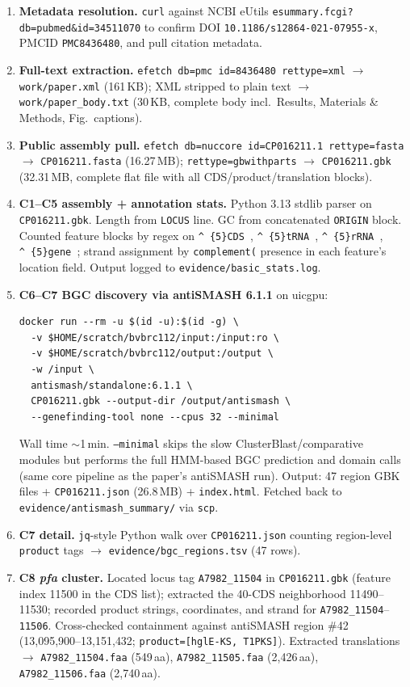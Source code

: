 \documentclass[11pt,letterpaper]{article}
\begin{document}
\begin{enumerate}
\item \textbf{Metadata resolution.} \texttt{curl} against NCBI eUtils \texttt{esummary.fcgi?db=pubmed\&id=34511070} to confirm DOI \texttt{10.1186/s12864-021-07955-x}, PMCID \texttt{PMC8436480}, and pull citation metadata.
\item \textbf{Full-text extraction.} \texttt{efetch db=pmc id=8436480 rettype=xml} $\to$ \texttt{work/paper.xml} (161\,KB); XML stripped to plain text $\to$ \texttt{work/paper\_body.txt} (30\,KB, complete body incl.\ Results, Materials \& Methods, Fig.\ captions).
\item \textbf{Public assembly pull.} \texttt{efetch db=nuccore id=CP016211.1 rettype=fasta} $\to$ \texttt{CP016211.fasta} (16.27\,MB); \texttt{rettype=gbwithparts} $\to$ \texttt{CP016211.gbk} (32.31\,MB, complete flat file with all CDS/product/translation blocks).
\item \textbf{C1--C5 assembly + annotation stats.} Python 3.13 stdlib parser on \texttt{CP016211.gbk}. Length from \texttt{LOCUS} line. GC from concatenated \texttt{ORIGIN} block. Counted feature blocks by regex on \texttt{\textasciicircum{}\ \{5\}CDS\ }, \texttt{\textasciicircum{}\ \{5\}tRNA\ }, \texttt{\textasciicircum{}\ \{5\}rRNA\ }, \texttt{\textasciicircum{}\ \{5\}gene\ }; strand assignment by \texttt{complement(} presence in each feature's location field. Output logged to \texttt{evidence/basic\_stats.log}.
\item \textbf{C6--C7 BGC discovery via antiSMASH 6.1.1} on uicgpu:
\begin{Verbatim}[fontsize=\small]
docker run --rm -u $(id -u):$(id -g) \
  -v $HOME/scratch/bvbrc112/input:/input:ro \
  -v $HOME/scratch/bvbrc112/output:/output \
  -w /input \
  antismash/standalone:6.1.1 \
  CP016211.gbk --output-dir /output/antismash \
  --genefinding-tool none --cpus 32 --minimal
\end{Verbatim}
Wall time $\sim$1\,min. \texttt{--minimal} skips the slow ClusterBlast/comparative modules but performs the full HMM-based BGC prediction and domain calls (same core pipeline as the paper's antiSMASH run). Output: 47 region GBK files + \texttt{CP016211.json} (26.8\,MB) + \texttt{index.html}. Fetched back to \texttt{evidence/antismash\_summary/} via \texttt{scp}.
\item \textbf{C7 detail.} \texttt{jq}-style Python walk over \texttt{CP016211.json} counting region-level \texttt{product} tags $\to$ \texttt{evidence/bgc\_regions.tsv} (47 rows).
\item \textbf{C8 \emph{pfa} cluster.} Located locus tag \texttt{A7982\_11504} in \texttt{CP016211.gbk} (feature index 11500 in the CDS list); extracted the 40-CDS neighborhood 11490--11530; recorded product strings, coordinates, and strand for \texttt{A7982\_11504}--\texttt{11506}. Cross-checked containment against antiSMASH region \#42 (13{,}095{,}900--13{,}151{,}432; \texttt{product=[hglE-KS,\ T1PKS]}). Extracted translations $\to$ \texttt{A7982\_11504.faa} (549\,aa), \texttt{A7982\_11505.faa} (2{,}426\,aa), \texttt{A7982\_11506.faa} (2{,}740\,aa).

\end{enumerate}
\end{document}
